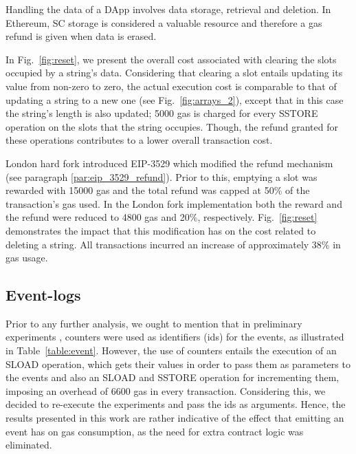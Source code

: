 Handling the data of a DApp involves data storage, retrieval and deletion. In Ethereum, SC storage is considered a valuable resource and therefore a gas refund is given when data is erased.

In Fig.~\ref{fig:reset}, we present the overall cost associated with clearing the slots occupied by a string’s data. Considering that clearing a slot entails updating its value from non-zero to zero, the actual execution cost is comparable to that of updating a string to a new one (see Fig.~\ref{fig:arrays_2}), except that in this case the string's length is also updated; 5000 gas is charged for every SSTORE operation on the slots that the string occupies. Though, the refund granted for these operations contributes to a lower overall transaction cost.

London hard fork introduced EIP-3529  \citep{buterin_eip_3529} which modified the refund mechanism (see paragraph \ref{par:eip_3529_refund}). Prior to this, emptying a slot was rewarded with 15000 gas and the total refund was capped at 50\% of the transaction’s gas used. In the London fork implementation both the reward and the refund were reduced to 4800 gas and 20\%, respectively. Fig.~\ref{fig:reset} demonstrates the impact that this modification has on the cost related to deleting a string. All transactions incurred an increase of approximately 38\% in gas usage.

\subsection{Event-logs}\label{subsection:evaluation_logs}

Prior to any further analysis, we ought to mention that in preliminary experiments \citep{kostamis_2021}, counters were used as identifiers (ids) for the events, as illustrated in Table~\ref{table:event}. However, the use of counters entails the execution of an SLOAD operation, which gets their values in order to pass them as parameters to the events and also an SLOAD and SSTORE operation for incrementing them, imposing an overhead of 6600 gas in every transaction. Considering this, we decided to re-execute the experiments and pass the ids as arguments. Hence, the results presented in this work are rather indicative of the effect that emitting an event has on gas consumption, as the need for extra contract logic was eliminated.

